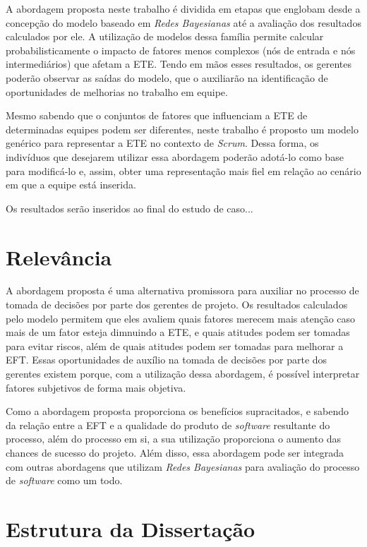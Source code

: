 A abordagem proposta neste trabalho é dividida em etapas que englobam desde a concepção do modelo baseado em \textit{Redes Bayesianas} até a avaliação dos resultados calculados por ele. A utilização de modelos dessa família permite calcular probabilisticamente o impacto de fatores menos complexos (nós de entrada e nós intermediários) que afetam a ETE. Tendo em mãos esses resultados, os gerentes poderão observar as saídas do modelo, que o auxiliarão na identificação de oportunidades de melhorias no trabalho em equipe.

Mesmo sabendo que o conjuntos de fatores que influenciam a ETE de determinadas equipes podem ser diferentes, neste trabalho é proposto um modelo genérico para representar a ETE no contexto de \textit{Scrum}. Dessa forma, os indivíduos que desejarem utilizar essa abordagem poderão adotá-lo como base para modificá-lo e, assim, obter uma representação mais fiel em relação ao cenário em que a equipe está inserida.

{\color{red} Os resultados serão inseridos ao final do estudo de caso...}

\section{Relevância}
\label{intro:rel}

A abordagem proposta é uma alternativa promissora para auxiliar no processo de tomada de decisões por parte dos gerentes de projeto. Os resultados calculados pelo modelo permitem que eles avaliem quais fatores merecem mais atenção caso mais de um fator esteja dimnuindo a ETE, e quais atitudes podem ser tomadas para evitar riscos, além de quais atitudes podem ser tomadas para melhorar a EFT. Essas oportunidades de auxílio na tomada de decisões por parte dos gerentes existem porque, com a utilização dessa abordagem, é possível interpretar fatores subjetivos de forma mais objetiva.

Como a abordagem proposta proporciona os benefícios supracitados, e sabendo da relação entre a EFT e a qualidade do produto de \textit{software} resultante do processo, além do processo em si, a sua utilização proporciona o aumento das chances de sucesso do projeto. Além disso, essa abordagem pode ser integrada com outras abordagens que utilizam \textit{Redes Bayesianas} para avaliação do processo de \textit{software} como um todo.

\section{Estrutura da Dissertação}
\label{intro:estr}


